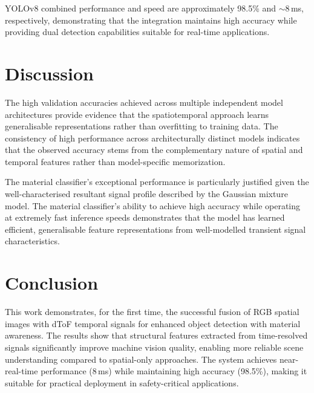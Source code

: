 \documentclass[10pt,twocolumn]{article}
\begin{document}
YOLOv8 combined performance and speed are approximately 98.5\% and $\sim$8\,ms, respectively, demonstrating that the integration maintains high accuracy while providing dual detection capabilities suitable for real-time applications.

\section{Discussion}

The high validation accuracies achieved across multiple independent model architectures provide evidence that the spatiotemporal approach learns generalisable representations rather than overfitting to training data. The consistency of high performance across architecturally distinct models indicates that the observed accuracy stems from the complementary nature of spatial and temporal features rather than model-specific memorization.

The material classifier's exceptional performance is particularly justified given the well-characterised resultant signal profile described by the Gaussian mixture model. The material classifier's ability to achieve high accuracy while operating at extremely fast inference speeds demonstrates that the model has learned efficient, generalisable feature representations from well-modelled transient signal characteristics.

\section{Conclusion}

This work demonstrates, for the first time, the successful fusion of RGB spatial images with dToF temporal signals for enhanced object detection with material awareness. The results show that structural features extracted from time-resolved signals significantly improve machine vision quality, enabling more reliable scene understanding compared to spatial-only approaches. The system achieves near-real-time performance (8\,ms) while maintaining high accuracy (98.5\%), making it suitable for practical deployment in safety-critical applications.



\end{document}
